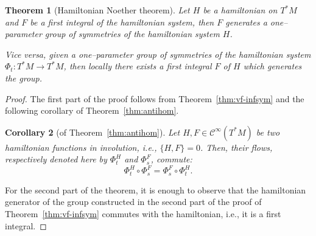 \documentclass[english,fontsize=11pt,paper=a5,oneside]{scrbook}
\newcommand{\cC}{\mathcal{C}}
\newtheorem{theorem}{Theorem}[chapter]
\newtheorem{corollary}[theorem]{Corollary}
\theoremstyle{definition}
\begin{document}
\begin{theorem}[Hamiltonian Noether theorem]
  Let $H$ be a hamiltonian on $T^*M$ and $F$ be a first integral of the hamiltonian system, then $F$ generates a one--parameter group of symmetries of the hamiltonian system $H$.

  Vice versa, given a one--parameter group of symmetries of the hamiltonian system $\Phi_t:T^*M\to T^* M$, then \emph{locally} there exists a first integral $F$ of $H$ which generates the group.
\end{theorem}
\begin{proof}
  The first part of the proof follows from Theorem~\ref{thm:vf-infsym} and the following corollary of Theorem~\ref{thm:antihom}.

  \begin{corollary}[of Theorem~\ref{thm:antihom}]
    Let $H, F \in \cC^\infty(T^*M)$ be two hamiltonian functions in involution, i.e., $\{H,F\}=0$.
    Then, their flows, respectively denoted here by $\Phi_t^H$ and $\Phi_s^F$, commute:
    \begin{equation}
      \Phi_t^H \circ \Phi_s^F = \Phi_s^F \circ \Phi_t^H.
    \end{equation}
  \end{corollary}

  For the second part of the theorem, it is enough to observe that the hamiltonian generator of the group constructed in the second part of the proof of Theorem~\ref{thm:vf-infsym} commutes with the hamiltonian, i.e., it is a first integral.
\end{proof}
\end{document}
